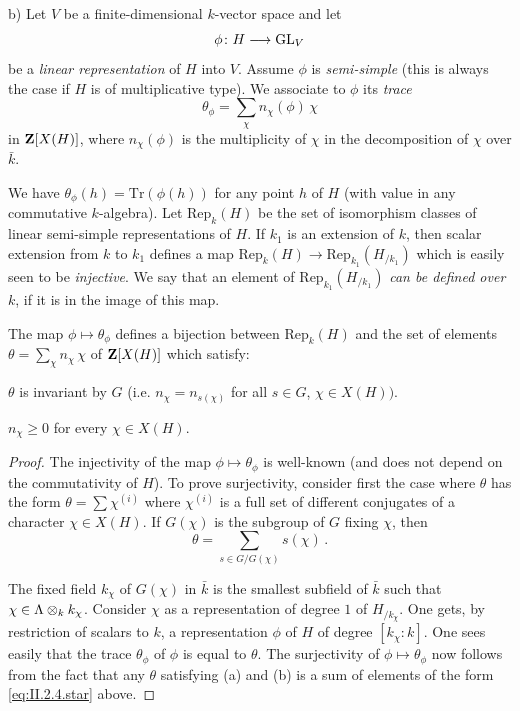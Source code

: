 b) Let $V$ be a finite-dimensional $k$-vector space and let
\[
\phi\colon H \longrightarrow \mathrm{GL}_V
\]
be a \emph{linear representation} of $H$ into $V$.  Assume $\phi$ is
\emph{semi-simple} (this is always the case if $H$ is of multiplicative
type).  We associate to $\phi$ its \emph{trace}
\[
\theta_\phi = \sum_\chi n_\chi(\phi)\,\chi
\]
in $\mathbf{Z}[X(H)]$, where $n_\chi(\phi)$ is the multiplicity of $\chi$ in the
decomposition of $\chi$ over $\bar{k}$.

We have $\theta_\phi(h) = \mathrm{Tr}(\phi(h))$ for any point $h$ of $H$
(with value in any commutative $k$-algebra).  Let
$\mathrm{Rep}_k(H)$ be the set of isomorphism classes of linear
semi-simple representations of $H$.  If $k_1$ is an extension of $k$,
then scalar extension from $k$ to $k_1$ defines a map
$\mathrm{Rep}_k(H) \to \mathrm{Rep}_{k_1}(H_{/k_1})$ which is easily
seen to be \emph{injective}.  We say that an element of
$\mathrm{Rep}_{k_1}(H_{/k_1})$ \emph{can be defined over} $k$, if it is
in the image of this map.

\begin{proposition}[1]\label{prop:II.2.4.1}
The map $\phi \mapsto \theta_\phi$ defines a bijection between
$\mathrm{Rep}_k(H)$ and the set of elements
$\theta = \sum_\chi n_\chi\,\chi$ of $\mathbf{Z}[X(H)]$ which satisfy:
\begin{alist}
\item $\theta$ is invariant by $G$ (i.e.  $n_\chi = n_{s(\chi)}$ for all
$s \in G$, $\chi \in X(H))$.
\item $n_\chi \geq 0$ for every $\chi \in X(H)$.
\end{alist}
\end{proposition}

\begin{proof}
The injectivity of the map $\phi \mapsto \theta_\phi$ is well-known (and
does not depend on the commutativity of $H$).  To prove surjectivity,
consider first the case where $\theta$ has the form
$\theta = \sum \chi^{(i)}$ where $\chi^{(i)}$ is a full set of different
conjugates of a character $\chi \in X(H)$.  If $G(\chi)$ is the subgroup
of $G$ fixing $\chi$, then
\begin{equation}
\tag{$*$}\label{eq:II.2.4.star}
\theta = \sum_{s \in G/G(\chi)} s(\chi)\,.
\end{equation}

The fixed field $k_\chi$ of $G(\chi)$ in $\bar{k}$ is the smallest
subfield of $\bar{k}$ such that $\chi \in \Lambda \mathbin{\otimes}_k k_\chi$.
Consider $\chi$ as a representation of degree $1$ of $H_{/k_\chi}$.
One gets, by restriction of scalars to $k$, a representation $\phi$ of
$H$ of degree $[k_\chi : k]$.  One sees easily that the trace
$\theta_\phi$ of $\phi$ is equal to $\theta$.  The surjectivity of
$\phi \mapsto \theta_\phi$ now follows from the fact that any $\theta$
satisfying (a) and (b) is a sum of elements of the form
\eqref{eq:II.2.4.star} above.
\end{proof}

